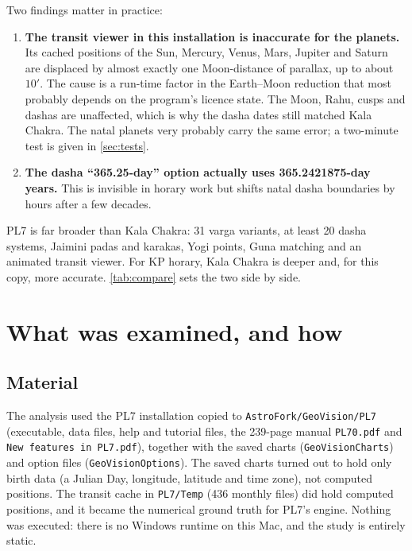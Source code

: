 \documentclass[11pt, a4paper]{article}
\DeclareRobustCommand{\_}{\textunderscore\allowbreak}
\begin{document}
Two findings matter in practice:

\begin{enumerate}[leftmargin=*]
  \item \textbf{The transit viewer in this installation is inaccurate for the planets.} Its
  cached positions of the Sun, Mercury, Venus, Mars, Jupiter and Saturn are displaced by
  almost exactly one Moon-distance of parallax, up to about $10'$. The cause is a run-time
  factor in the Earth--Moon reduction that most probably depends on the program's licence
  state. The Moon, Rahu, cusps and dashas are unaffected, which is why the dasha dates still
  matched Kala Chakra. The natal planets very probably carry the same error; a two-minute
  test is given in \autoref{sec:tests}.
  \item \textbf{The dasha ``365.25-day'' option actually uses 365.2421875-day years.} This
  is invisible in horary work but shifts natal dasha boundaries by hours after a few decades.
\end{enumerate}

PL7 is far broader than Kala Chakra: 31 varga variants, at least 20 dasha systems, Jaimini
padas and karakas, Yogi points, Guna matching and an animated transit viewer. For KP
horary, Kala Chakra is deeper and, for this copy, more accurate. \autoref{tab:compare} sets
the two side by side.

\section{What was examined, and how}
\label{sec:method}

\subsection{Material}

The analysis used the PL7 installation copied to \texttt{Astro\_Fork/GeoVision/PL7}
(executable, data files, help and tutorial files, the 239-page manual \texttt{PL70.pdf} and
\texttt{New features in PL7.pdf}), together with the saved charts
(\texttt{GeoVisionCharts}) and option files (\texttt{GeoVisionOptions}). The saved charts
turned out to hold only birth data (a Julian Day, longitude, latitude and time zone), not
computed positions. The transit cache in \texttt{PL7/Temp} (436 monthly files) did hold
computed positions, and it became the numerical ground truth for PL7's engine. Nothing was
executed: there is no Windows runtime on this Mac, and the study is entirely static.
\end{document}
